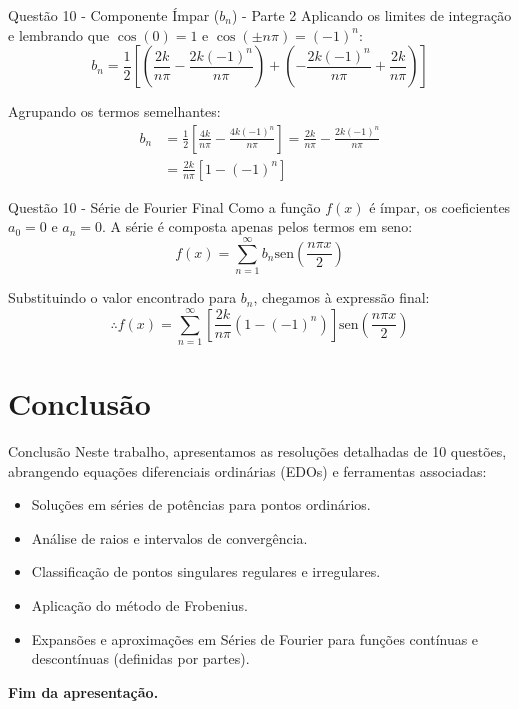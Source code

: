 \documentclass[8pt,aspectratio = 169]{beamer}
\begin{document}
\begin{frame}{Questão 10 - Componente Ímpar ($b_n$) - Parte 2}
    Aplicando os limites de integração e lembrando que $\cos(0)=1$ e $\cos(\pm n\pi) = (-1)^n$:
    \begin{equation*}
        b_n = \frac{1}{2} \left[ \left( \frac{2k}{n\pi} - \frac{2k(-1)^n}{n\pi} \right) + \left( -\frac{2k(-1)^n}{n\pi} + \frac{2k}{n\pi} \right) \right]
    \end{equation*}
    
    Agrupando os termos semelhantes:
    \begin{align*}
        b_n &= \frac{1}{2} \left[ \frac{4k}{n\pi} - \frac{4k(-1)^n}{n\pi} \right] = \frac{2k}{n\pi} - \frac{2k(-1)^n}{n\pi} \\[10pt]
        &= \frac{2k}{n\pi} \left[ 1 - (-1)^n \right]
    \end{align*}
\end{frame}

\begin{frame}{Questão 10 - Série de Fourier Final}
    Como a função $f(x)$ é ímpar, os coeficientes $a_0 = 0$ e $a_n = 0$. A série é composta apenas pelos termos em seno:
    \begin{equation*}
        f(x) = \sum_{n=1}^{\infty} b_n \text{sen}\left(\frac{n\pi x}{2}\right)
    \end{equation*}
    
    Substituindo o valor encontrado para $b_n$, chegamos à expressão final:
    \begin{equation*}
        \therefore f(x) = \sum_{n=1}^{\infty} \left[ \frac{2k}{n\pi} (1 - (-1)^n) \right] \text{sen}\left(\frac{n\pi x}{2}\right)
    \end{equation*}
\end{frame}
  
\section{Conclusão}

\begin{frame}{Conclusão}
    Neste trabalho, apresentamos as resoluções detalhadas de 10 questões, abrangendo equações diferenciais ordinárias (EDOs) e ferramentas associadas: 
    \begin{itemize}
        \item Soluções em séries de potências para pontos ordinários.
        \item Análise de raios e intervalos de convergência.
        \item Classificação de pontos singulares regulares e irregulares.
        \item Aplicação do método de Frobenius.
        \item Expansões e aproximações em Séries de Fourier para funções contínuas e descontínuas (definidas por partes).
    \end{itemize}
    \vspace{0.5cm}
    \centering \textbf{Fim da apresentação.}
\end{frame}
\end{document}
